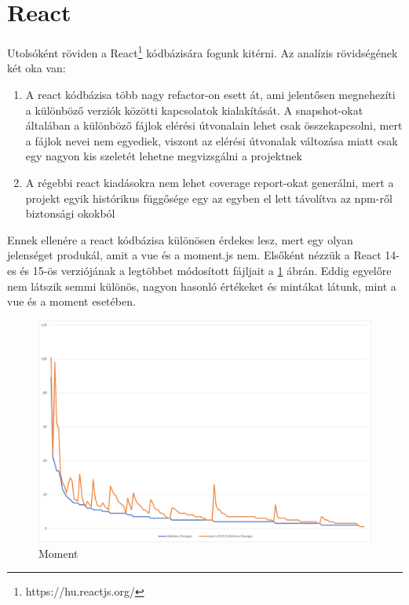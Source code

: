\section{React}

Utolsóként röviden a React\footnote{https://hu.reactjs.org/} kódbázisára fogunk kitérni. Az analízis rövidségének két oka van:
\begin{enumerate}
    \item A react kódbázisa több nagy refactor-on esett át, ami jelentősen megnehezíti a különböző verziók közötti kapcsolatok kialakítását. A snapshot-okat általában a különböző fájlok elérési útvonalain lehet csak összekapcsolni, mert a fájlok nevei nem egyediek, viszont az elérési útvonalak változása miatt csak egy nagyon kis szeletét lehetne megvizsgálni a projektnek
    \item A régebbi react kiadásokra nem lehet coverage report-okat generálni, mert a projekt egyik histórikus függősége egy az egyben el lett távolítva az npm-ről biztonsági okokból
\end{enumerate}

Ennek ellenére a react kódbázisa különösen érdekes lesz, mert egy olyan jelenséget produkál, amit a vue és a moment.js nem.
Elsőként nézzük a React 14-es és 15-ös verziójának a legtöbbet módosított fájljait a \ref{fig:react-14-15-changes} ábrán. Eddig egyelőre nem látszik semmi különös, nagyon hasonló értékeket és mintákat látunk, mint a vue és a moment esetében.

\begin{figure}[H]
    \centering
    \includegraphics[width=1\textwidth]{images/react/react-14-15-changes.png}
    \caption{Moment}
    \label{fig:react-14-15-changes}
\end{figure}


